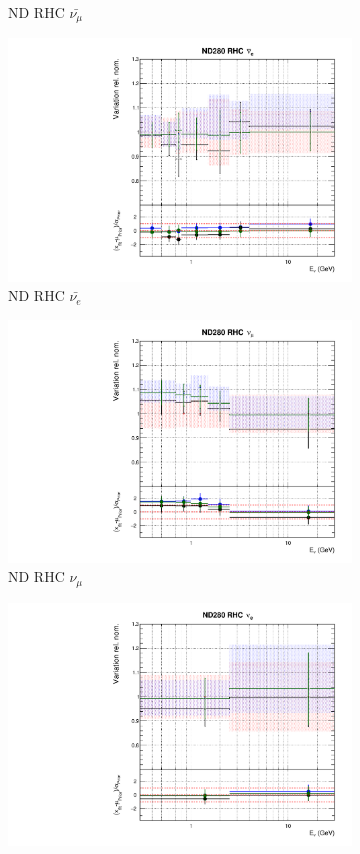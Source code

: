 \begin{figure}
\begin{subfigure}{0.24\textwidth}
  \caption{ND RHC $\bar{\nu_{\mu}}$}
\end{subfigure}
\begin{subfigure}{0.24\textwidth}
  \centering
  \includegraphics[width=0.95\linewidth]{figs/fgdfitsflux_5}
  \caption{ND RHC $\bar{\nu_{e}}$}
\end{subfigure}
\begin{subfigure}{0.24\textwidth}
  \centering
  \includegraphics[width=0.95\linewidth]{figs/fgdfitsflux_6}
  \caption{ND RHC $\nu_{\mu}$}
\end{subfigure}
\vspace{15mm}
\begin{subfigure}{0.24\textwidth}
  \centering
  \includegraphics[width=0.95\linewidth]{figs/fgdfitsflux_7}

\end{subfigure}
\end{figure}
